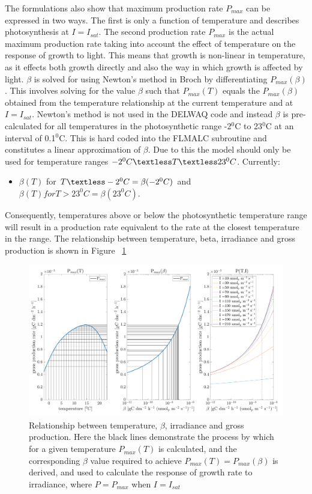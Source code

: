 \documentclass{deltares_manual}
\begin{document}
The formulations also show that maximum production rate $P_{max}$ can be expressed in two ways. The first is only a function of temperature and describes photosynthesis at $I = I_{sat}$. The second production rate $P_{max}$ is the actual maximum production rate taking into account the effect of temperature on the response of growth to light. This means that growth is non-linear in temperature, as it effects both growth directly and also the way in which growth is affected by light. $\beta$ is solved for using Newton's method in Broch by differentiating $P_{max}(\beta)$. This involves solving for the value $\beta$ such that $P_{max}(T)$ equals the $P_{max}(\beta)$ obtained from the temperature relationship at the current temperature and at $I = I_{sat}$. Newton's method is not used in the DELWAQ code and instead $\beta$ is pre-calculated for all temperatures in the photosynthetic range -2$^{0}$C to 23$^{0}$C at an interval of 0.1$^{0}$C. This is hard coded into the FLMALC subroutine and constitutes a linear approximation of $\beta$. Due to this the model should only be used for temperature ranges $-2^{0}C \textless T \textless 23^{0}C$. Currently:
\begin{itemize}
	\item $\beta(T)$ for $T \textless -2^{0}C = \beta(-2^{0}C)$ and $\beta(T) for T > 23^{0}C = \beta(23^{0}C)$. 
\end{itemize} 

Consequently, temperatures above or below the photosynthetic temperature range will result in a production rate equivalent to the rate at the closest temperature in the range. The relationship between temperature, beta, irradiance and gross production is shown in Figure ~\ref{fig:lightequations}

\begin{figure}[H]
	\centering
	\includegraphics[width=1\linewidth]{figures/light_equations_crop}
	\caption[]{Relationship between temperature, $\beta$, irradiance and gross production. Here the black lines demonstrate the process by which for a given temperature $P_{max}(T)$ is calculated, and the corresponding $\beta$ value required to achieve $P_{max}(T) = P_{max}(\beta)$ is derived, and used to calculate the response of growth rate to irradiance, where $P = P_{max}$ when $I = I_{sat}$}
	\label{fig:lightequations}
\end{figure}
\pagebreak
\end{document}
